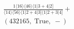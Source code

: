 \documentclass[varwidth, border=5pt]{standalone}
\begin{document}
\begin{my}
$\begin{gathered}
\scriptscriptstyle\frac{1⟨16⟩⟨46⟩⟨1|3+4|2]}{⟨14⟩⟨56⟩⟨1|2+4|3]⟨1|2+3|4]}+\\
\scriptscriptstyle(432165,\;\text{True},\;-)\phantom{+}
\end{gathered}$
\end{my}
\end{document}
